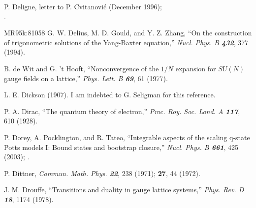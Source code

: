 

 P. Deligne,
    letter to P. Cvitanovi\'c (December 1996);
    \\
    .


        {MR95k:81058} G. W. Delius, M. D. Gould, and Y. Z. Zhang,
    ``On the construction of
      trigonometric solutions of the Yang-Baxter equation,''
    {\em Nucl. Phys. B  \bf 432}, 377 (1994). %

 B. de Wit and G. 't Hooft,
``Nonconvergence of the $1/N$ expansion for
  $SU(N)$ gauge fields on a lattice,''
    {\em Phys.  Lett.  B  \bf 69}, 61 (1977).

 L. E. Dickson (1907).
I am indebted to G.  Seligman for this reference.

P. A. Dirac,
``The quantum theory of electron,''
{\em Proc.  Roy.  Soc.  Lond.    A \bf 117}, 610 (1928).

 P. Dorey, A. Pocklington, and  R. Tateo,
    ``Integrable aspects of the scaling q-state Potts models I:
    Bound states and bootstrap closure,''
    {\em Nucl. Phys. B \bf 661},  425 (2003); %
    .

P. Dittner,
{\em Commun. Math. Phys.  \bf 22}, 238 (1971); {\bf 27}, 44 (1972).

J. M. Drouffe,
``Transitions and duality in gauge lattice systems,''
{\em Phys.  Rev.    D \bf  18}, 1174 (1978).

